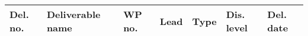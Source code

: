 \documentclass[a4paper,11pt]{article}
\begin{document}
\newpage
{}
\label{sect:deliverables}

\begin{minipage}{\textwidth}
\begin{center}
\begin{tabular}{|p{0.8cm}|p{9.25cm}|p{0.8cm}|p{1.15cm}|p{1.6cm}|p{0.8cm}|p{0.8cm}|}  \hline
\textbf{Del. no.}              & \textbf{Deliverable name}        & \textbf{WP no.} & \textbf{Lead}
& \textbf{Type}              & \textbf{Dis. level}   & \textbf{Del. date}
\\ \hline



\end{tabular}
\end{center}
\end{minipage}
\end{document}
